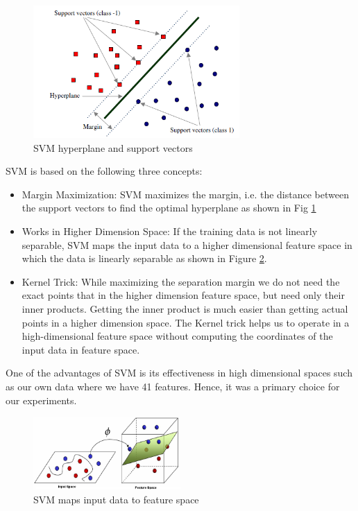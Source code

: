 \begin{figure}[htb]
	\centering
	\includegraphics[width=0.7\textwidth]{images/svm-hyperplane.png}
	\caption{SVM hyperplane and support vectors} 
	\label{fig:svm_hyperplane}
\end{figure}

SVM is based on the following three concepts:

\begin{itemize}
	\item Margin Maximization:
	SVM maximizes the margin, i.e. the distance between the support vectors to find the optimal hyperplane as shown in Fig \ref{fig:svm_hyperplane}
	\item Works in Higher Dimension Space:
	If the training data is not linearly separable, SVM maps the input data to a higher dimensional feature space in which the data is linearly separable as shown in Figure \ref{fig:svm_kernel}.
	\item Kernel Trick:
	While maximizing the separation margin we do not need the exact points that in the higher dimension feature space, but need only their inner products. Getting the inner product is much easier than getting actual points in a higher dimension space. The Kernel trick helps us to operate in a high-dimensional feature space without computing the coordinates of the input data in feature space.
\end{itemize}

One of the advantages of SVM is its effectiveness in high dimensional spaces such as our own data where we have 41 features. Hence, it was a primary choice for our experiments.

\begin{figure}[htb]
	\centering
	\includegraphics[width=0.5\textwidth]{images/svm-kernel.png}
	\caption{SVM maps input data to feature space} 
	\label{fig:svm_kernel}
\end{figure}

